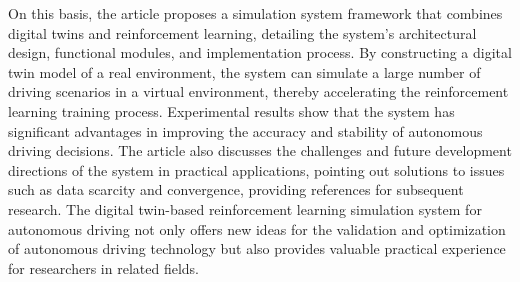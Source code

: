 \begin{abstracten}
On this basis, the article proposes a simulation system framework that combines digital twins and 
reinforcement learning, detailing the system's architectural design, functional modules, and 
implementation process. By constructing a digital twin model of a real environment, the system can 
simulate a large number of driving scenarios in a virtual environment, thereby accelerating the 
reinforcement learning training process. Experimental results show that the system has significant 
advantages in improving the accuracy and stability of autonomous driving decisions. The article also 
discusses the challenges and future development directions of the system in practical applications, 
pointing out solutions to issues such as data scarcity and convergence, providing references for 
subsequent research. The digital twin-based reinforcement learning simulation system for autonomous 
driving not only offers new ideas for the validation and optimization of autonomous driving technology 
but also provides valuable practical experience for researchers in related fields.

\end{abstracten}